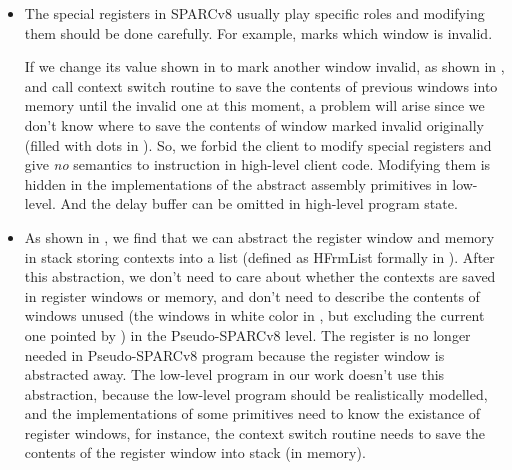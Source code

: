 \begin{itemize}
    \item
    The special registers in SPARCv8 usually play specific
    roles and modifying them should be done carefully.
    For example, \regwim{} marks which window is invalid.
    \begin{center}
        \vspace*{-0.5em}
        
        \vspace*{-0.5em}
        \label{fig:problem of modifying wim arbitrary}
    \end{center}
    If we change its value shown in
    \Fig{\ref{fig:Abstraction of Register Windows and Memory}}
    to mark another window invalid, as shown in
    \Fig{\ref{fig:problem of modifying wim arbitrary}},
    and call context switch routine to
    save the contents of previous windows into memory
    until the invalid one at this moment,
    a problem will arise since we don't know
    where to save the contents of window marked
    invalid originally
    (filled with dots
    in \Fig{\ref{fig:problem of modifying wim arbitrary}}).
    So, we forbid the client
    to modify special registers and give \textit{no}
    semantics to instruction \cwr{} in high-level
    client code. Modifying them is hidden in the
    implementations of the abstract assembly primitives
    in low-level.
    And the delay buffer can be omitted in high-level
    program state.
    \item
    As shown in \Fig{\ref{fig:Abstraction of Register Windows and Memory}},
    we find that we can abstract the register window
    and memory in stack storing contexts
    into a list (defined as
    HFrmList formally in \Fig{\ref{fig:machine-state-concur-pseudo-sparc}}).
    After this abstraction, we don't need to care about
    whether the contexts are saved in register windows or
    memory, and don't need to describe the contents of windows unused
    (the windows in white color in
    \Fig{\ref{fig:Abstraction of Register Windows and Memory}},
    but excluding the current one pointed by \regcwp{})
    in the Pseudo-SPARCv8 level.
    The \regcwp{} register is no longer needed in
    Pseudo-SPARCv8 program because the register window
    is abstracted away.
    The low-level program in our work doesn't use this
    abstraction, because the low-level program
    should be realistically modelled,
    and the implementations of some primitives
    need to know the existance of register windows,
    for instance, the context switch routine
    needs to save the contents
    of the register window into stack (in memory).
\end{itemize}

